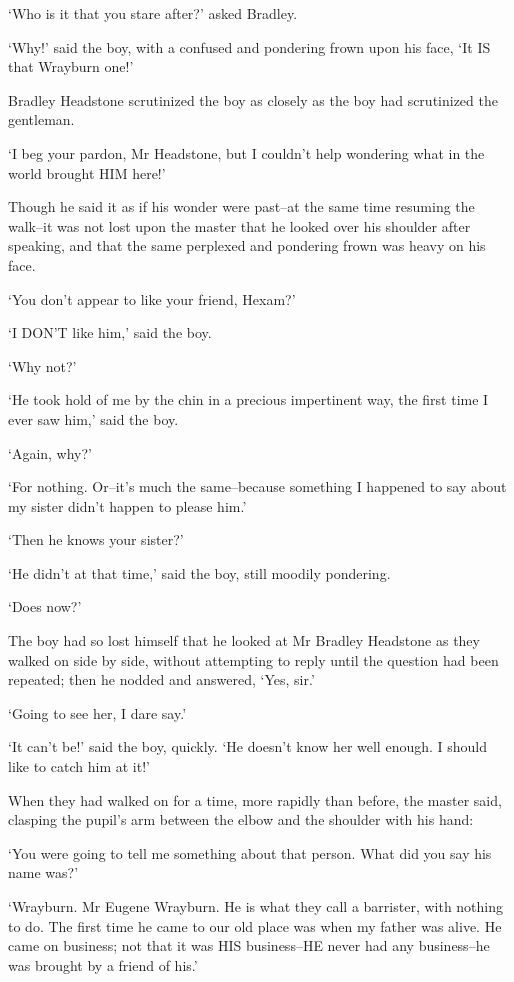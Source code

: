 ‘Who is it that you stare after?’ asked Bradley.

‘Why!’ said the boy, with a confused and pondering frown upon his face,
‘It IS that Wrayburn one!’

Bradley Headstone scrutinized the boy as closely as the boy had
scrutinized the gentleman.

‘I beg your pardon, Mr Headstone, but I couldn’t help wondering what in
the world brought HIM here!’

Though he said it as if his wonder were past--at the same time resuming
the walk--it was not lost upon the master that he looked over his
shoulder after speaking, and that the same perplexed and pondering frown
was heavy on his face.

‘You don’t appear to like your friend, Hexam?’

‘I DON’T like him,’ said the boy.

‘Why not?’

‘He took hold of me by the chin in a precious impertinent way, the first
time I ever saw him,’ said the boy.

‘Again, why?’

‘For nothing. Or--it’s much the same--because something I happened to
say about my sister didn’t happen to please him.’

‘Then he knows your sister?’

‘He didn’t at that time,’ said the boy, still moodily pondering.

‘Does now?’

The boy had so lost himself that he looked at Mr Bradley Headstone
as they walked on side by side, without attempting to reply until the
question had been repeated; then he nodded and answered, ‘Yes, sir.’

‘Going to see her, I dare say.’

‘It can’t be!’ said the boy, quickly. ‘He doesn’t know her well enough.
I should like to catch him at it!’

When they had walked on for a time, more rapidly than before, the master
said, clasping the pupil’s arm between the elbow and the shoulder with
his hand:

‘You were going to tell me something about that person. What did you say
his name was?’

‘Wrayburn. Mr Eugene Wrayburn. He is what they call a barrister, with
nothing to do. The first time he came to our old place was when my
father was alive. He came on business; not that it was HIS business--HE
never had any business--he was brought by a friend of his.’

